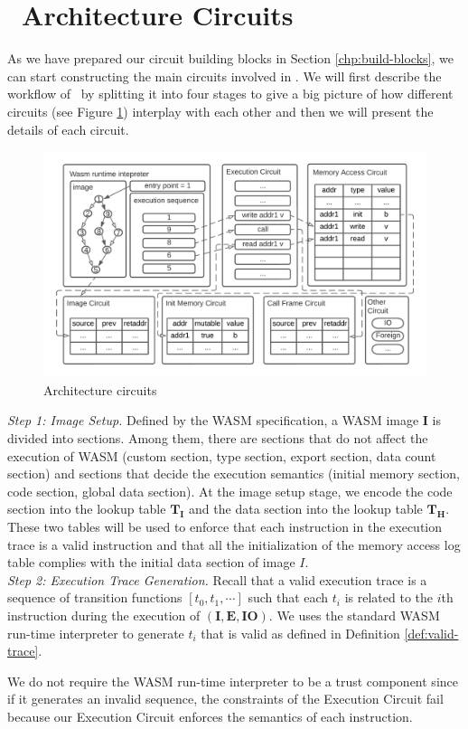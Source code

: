 
\section{\zkwasm\ Architecture Circuits}
\label{chp:architecture-circuits}

As we have prepared our circuit building blocks in Section \ref{chp:build-blocks}, we can start constructing the main circuits involved in \zkwasm. We will first describe the workflow of \zkwasm\, by splitting it into four stages to give a big picture of how different circuits (see Figure \ref{fig:arch-circuits}) interplay with each other and then we will present the details of each circuit.

\begin{figure}[!ht]
\centerline{
\includegraphics[scale=0.7]{figs/arch-circuits.png}
}
\caption{Architecture circuits}\label{fig:arch-circuits}
\end{figure}


\noindent\emph{Step 1: Image Setup.}
Defined by the WASM specification, a WASM image $\mathbf{I}$ is divided into sections. Among them, there are sections that do not affect the execution of WASM (custom section, type section, export section, data count section) and sections that decide the execution semantics (initial memory section, code section, global data section). At the image setup stage, we encode the code section into the lookup table $\mathbf{T}_\mathbf{I}$ and the data section into the lookup table $\mathbf{T}_\mathbf{H}$. These two tables will be used to enforce that each instruction in the execution trace is a valid instruction and that all the initialization of the memory access log table complies with the initial data section of image $I$.\\

\noindent\emph{Step 2: Execution Trace Generation.}
Recall that a valid execution trace is a sequence of transition functions $\left[t_0, t_1, \cdots\right]$ such that each $t_i$ is related to the 
$i$th instruction during the execution of $(\mathbf{I}, \mathbf{E}, \mathbf{IO})$. We uses the standard WASM run-time interpreter to generate ${t_i}$ that is valid as defined in Definition \ref{def:valid-trace}.
\begin{remark}
We do not require the WASM run-time interpreter to be a trust component since if it generates an invalid sequence, the constraints of the Execution Circuit fail because our Execution Circuit enforces the semantics of each instruction.
\end{remark}

